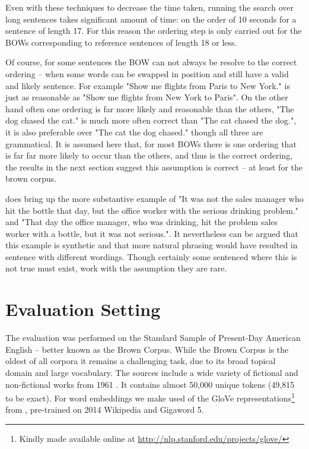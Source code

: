 \documentclass[]{scrartcl}
\numberwithin{equation}{section}
\numberwithin{figure}{section}
\theoremstyle{plain}
\theoremstyle{definition}
\begin{document}
Even with these techniques to decrease the time taken, running the search over long sentences takes significant amount of time: on the order of 10 seconds for a sentence of length 17. For this reason the ordering step is only carried out for the BOWs corresponding to reference sentences of length 18 or less. 
 
 
Of course, for some sentences the BOW can not always be resolve to the correct ordering -- when some words can be swapped in position and still have a valid and likely sentence. For example "Show me flights from Paris to New York." is just as reasonable as  "Show me flights from New York to Paris". On the other hand often one ordering is far more likely and reasonable than the others, "The dog chased the cat." is much more often correct than "The cat chased the dog.", it is also preferable over "The cat the dog chased." though all three are grammatical. It is assumed here that, for most BOWs there is one ordering that is far far more likely to occur than the others, and thus is the correct ordering, the results in the next section suggest this assumption is correct -- at least for the brown corpus. 

\cite{Mitchell2008} does bring up the more substantive example of  "It was not the sales manager who  hit  the bottle that day, but the office worker with the serious drinking problem." and "That day the office manager,   who was drinking, hit the problem sales worker with a bottle, but it was not serious.". It nevertheless can be argued that this example is synthetic and that more natural phrasing would have resulted in sentence with different wordings. Though certainly some sentenced where this is not true must exist, work with the assumption they are rare.
  



\section{Evaluation Setting}

The evaluation was performed on the  Standard Sample of Present-Day American English -- better known as the Brown Corpus. While the Brown Corpus is the oldest of all corpora it remains a challenging task, due to its broad topical domain and large vocabulary. The sources include a wide variety of fictional and non-fictional works from 1961 \parencite{francis1979brown}. It contains almost 50,000 unique tokens (49,815 to be exact).
For word embeddings we make used of the GloVe representations\footnote{Kindly made available online at \url{http://nlp.stanford.edu/projects/glove/}} from \cite{pennington2014glove}, pre-trained on 2014 Wikipedia and Gigaword 5. 
\end{document}
